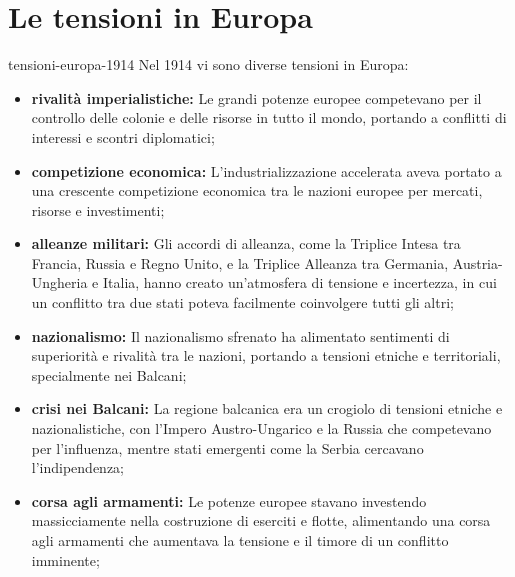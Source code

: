 \documentclass[preview]{standalone}
\begin{document}
\genpage

\section{Le tensioni in Europa}


\begin{snippet}{tensioni-europa-1914}
    Nel 1914 vi sono diverse tensioni in Europa:
    \begin{itemize}
        \item \textbf{rivalità imperialistiche:} Le grandi potenze europee competevano per il controllo delle colonie e delle risorse in tutto il mondo, portando a conflitti di interessi e scontri diplomatici;
        \item \textbf{competizione economica:} L'industrializzazione accelerata aveva portato a una crescente competizione economica tra le nazioni europee per mercati, risorse e investimenti;
        \item \textbf{alleanze militari:} Gli accordi di alleanza, come la Triplice Intesa tra Francia, Russia e Regno Unito, e la Triplice Alleanza tra Germania, Austria-Ungheria e Italia, hanno creato un'atmosfera di tensione e incertezza, in cui un conflitto tra due stati poteva facilmente coinvolgere tutti gli altri;
        \item \textbf{nazionalismo:} Il nazionalismo sfrenato ha alimentato sentimenti di superiorità e rivalità tra le nazioni, portando a tensioni etniche e territoriali, specialmente nei Balcani;
        \item \textbf{crisi nei Balcani:} La regione balcanica era un crogiolo di tensioni etniche e nazionalistiche, con l'Impero Austro-Ungarico e la Russia che competevano per l'influenza, mentre stati emergenti come la Serbia cercavano l'indipendenza;
        \item \textbf{corsa agli armamenti:} Le potenze europee stavano investendo massicciamente nella costruzione di eserciti e flotte, alimentando una corsa agli armamenti che aumentava la tensione e il timore di un conflitto imminente;
    \end{itemize}
\end{snippet}
\end{document}

